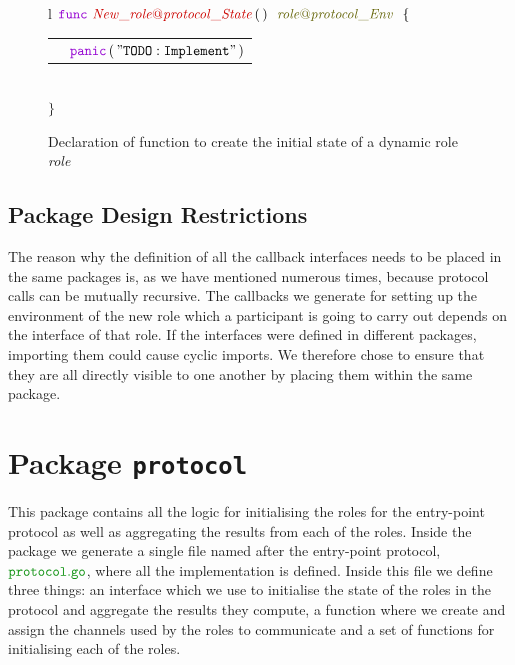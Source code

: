 \documentclass[12pt,twoside]{report}
\begin{document}
\begin{figure}[!h]
    \begin{center}
        \begin{tabular}{l}
            $\gofunc\ \functionname{New\_role@protocol\_State} \, (\,)\ \ \interfacename{\localprotocol{role}{protocol}\_Env}\ \ \{$\\[3pt]

            \begin{tabular}{ll}
                \indent & $\gopanic\,(\,\mathtt{"TODO: Implement"}\,)$\\[3.5pt]
            \end{tabular}\\[3pt]
            $\}$
        \end{tabular}
    \end{center}
    \caption{Declaration of function to create the initial state of a dynamic role \textit{role} }
    \label{new-role-state-func-gen}
\end{figure}

\subsection{Package Design Restrictions}

The reason why the definition of all the callback interfaces needs to be placed in the same packages is, as we have mentioned numerous times, because protocol calls can be mutually recursive. The callbacks we generate for setting up the environment of the new role which a participant is going to carry out depends on the interface of that role. If the interfaces were defined in different packages, importing them could cause cyclic imports. We therefore chose to ensure that they are all directly visible to one another by placing them within the same package.

\section{Package \texttt{protocol}}\label{entry-point}
This package contains all the logic for initialising the roles for the entry-point protocol as well as aggregating the results from each of the roles. Inside the package we generate a single file named after the entry-point protocol, $\filename{protocol}$, where all the implementation is defined. Inside this file we define three things: an interface which we use to initialise the state of the roles in the protocol and aggregate the results they compute, a function where we create and assign the channels used by the roles to communicate and a set of functions for initialising each of the roles.
\end{document}
